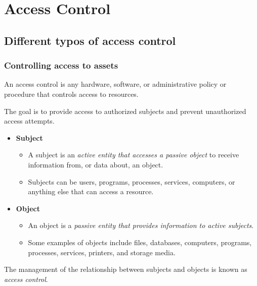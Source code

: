 

\section{Access Control}

\subsection{Different typos of access control}

\subsubsection{Controlling access to assets}
An access control is any hardware, software, or administrative policy or procedure that controls access to resources.

The goal is to provide access to authorized subjects and prevent unauthorized access attempts.\\
\begin{itemize}
    \item \textbf{Subject}
    \begin{itemize}
        \item A subject is an \textit{active entity that accesses a passive object} to receive information from, or data about, an object.
        \item Subjects can be users, programs, processes, services, computers, or anything else that can access a resource.
    \end{itemize}
    \item \textbf{Object}
    \begin{itemize}
        \item An object is a \textit{passive entity that provides information to active subjects}.
        \item Some examples of objects include files, databases, computers, programs, processes, services, printers, and storage media.\\
    \end{itemize}
\end{itemize}

The management of the relationship between subjects and objects is known as \textit{access control}.

